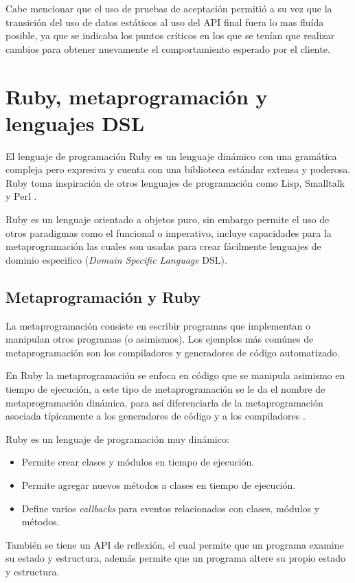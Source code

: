 Cabe mencionar que el uso de pruebas de aceptación permitió a su vez que la
transición del uso de datos estáticos al uso del API final fuera lo mas fluída
posible, ya que se indicaba los puntos críticos en los que se tenían que realizar
cambios para obtener nuevamente el comportamiento esperado por el cliente.

\section{Ruby, metaprogramación y lenguajes DSL}
El lenguaje de programación Ruby es un lenguaje dinámico con una gramática compleja
pero expresiva y cuenta con una biblioteca estándar extensa y poderosa.
Ruby toma inspiración de otros lenguajes de programación como Lisp, Smalltalk y Perl
\cite{24_matsumoto_2008}.

Ruby es un lenguaje orientado a objetos puro, sin embargo permite el uso de
otros paradigmas como el funcional o imperativo, incluye capacidades para la
metaprogramación las cuales son usadas para crear fácilmente lenguajes de
dominio especifico (\textit{Domain Specific Language} DSL)\cite{24_matsumoto_2008}.

\subsection{Metaprogramación y Ruby}
La metaprogramación consiste en escribir programas que implementan o manipulan otros
programas (o asimismos). Los ejemplos más comúnes de metaprogramación son los
compiladores y generadores de código automatizado.

En Ruby la metaprogramación se enfoca en código que se manipula asimismo en tiempo
de ejecución, a este tipo de metaprogramación se le da el nombre de metaprogramación
dinámica, para así diferenciarla de la metaprogramación asociada típicamente a
los generadores de código y a los compiladores \cite{2_perrotta_2010}.

Ruby es un lenguaje de programación muy dinámico:
\begin{itemize}
\item Permite crear clases y módulos en tiempo de ejecución.
\item Permite agregar nuevos métodos a clases en tiempo de ejecución.
\item Define varios \textit{callbacks} para eventos relacionados con clases, módulos
  y métodos.
\end{itemize}

También se tiene un API de reflexión, el cual permite que un programa examine
su estado y estructura, además permite que un programa altere su propio estado
y estructura.

